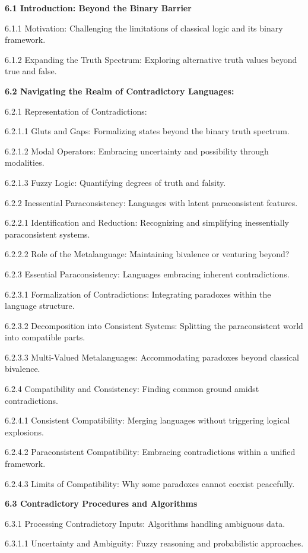 \textbf{6.1 Introduction: Beyond the Binary Barrier}

6.1.1 Motivation: Challenging the limitations of classical logic and its
binary framework.

6.1.2 Expanding the Truth Spectrum: Exploring alternative truth values
beyond true and false.

\textbf{6.2 Navigating the Realm of Contradictory Languages:}

6.2.1 Representation of Contradictions:

6.2.1.1 Gluts and Gaps: Formalizing states beyond the binary truth
spectrum.

6.2.1.2 Modal Operators: Embracing uncertainty and possibility through
modalities.

6.2.1.3 Fuzzy Logic: Quantifying degrees of truth and falsity.

6.2.2 Inessential Paraconsistency: Languages with latent paraconsistent
features.

6.2.2.1 Identification and Reduction: Recognizing and simplifying
inessentially paraconsistent systems.

6.2.2.2 Role of the Metalanguage: Maintaining bivalence or venturing
beyond?

6.2.3 Essential Paraconsistency: Languages embracing inherent
contradictions.

6.2.3.1 Formalization of Contradictions: Integrating paradoxes within
the language structure.

6.2.3.2 Decomposition into Consistent Systems: Splitting the
paraconsistent world into compatible parts.

6.2.3.3 Multi-Valued Metalanguages: Accommodating paradoxes beyond
classical bivalence.

6.2.4 Compatibility and Consistency: Finding common ground amidst
contradictions.

6.2.4.1 Consistent Compatibility: Merging languages without triggering
logical explosions.

6.2.4.2 Paraconsistent Compatibility: Embracing contradictions within a
unified framework.

6.2.4.3 Limits of Compatibility: Why some paradoxes cannot coexist
peacefully.

\textbf{6.3 Contradictory Procedures and Algorithms}

6.3.1 Processing Contradictory Inputs: Algorithms handling ambiguous
data.

6.3.1.1 Uncertainty and Ambiguity: Fuzzy reasoning and probabilistic
approaches.

